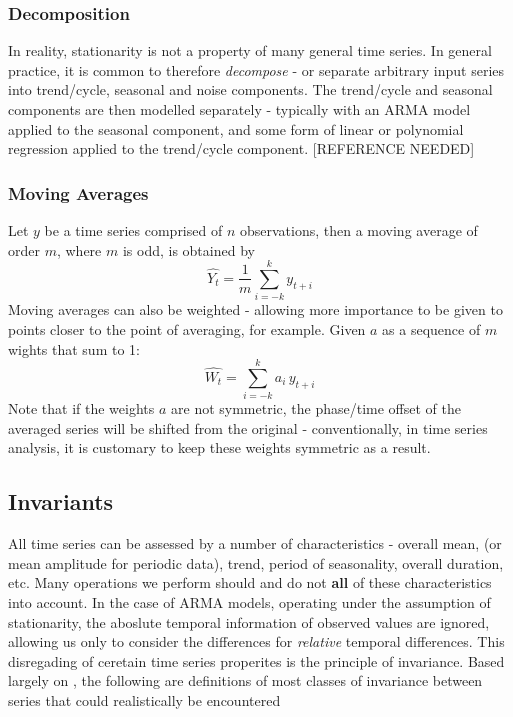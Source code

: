 \documentclass[9pt,conference]{IEEEtran}
\begin{document}
\subsubsection{Decomposition}
In reality, stationarity is not a property of many general time series. In general practice, it is common to therefore \textit{decompose} - or separate arbitrary input series into trend/cycle, seasonal and noise components. The trend/cycle and seasonal components are then modelled separately - typically with an ARMA model applied to the seasonal component, and some form of linear or polynomial regression applied to the trend/cycle component. [REFERENCE NEEDED]

\subsubsection{Moving Averages}
 Let $y$ be a time series comprised of $n$ observations, then a moving average of order $m$, where $m$ is odd, is obtained by
        \begin{equation}
            \hat{Y_t} = \frac{1}{m}\sum_{i = -k}^{k}y_{t+i}
        \end{equation}
        Moving averages can also be weighted - allowing more importance to be given to points closer to the point of averaging, for example. Given $a$ as a sequence of $m$ wights that sum to 1:
        \begin{equation}
            \hat{W_t} = \sum_{i = -k}^{k}a_i\,y_{t+i}
        \end{equation}
        Note that if the weights $a$ are not symmetric, the phase/time offset of the averaged series will be shifted from the original - conventionally, in time series analysis, it is customary to keep these weights symmetric as a result.

\subsection{Invariants}
 All time series can be assessed by a number of characteristics - overall mean, (or mean amplitude for periodic data), trend, period of seasonality, overall duration, etc. Many operations we perform should and do not \textbf{all} of these characteristics into account. In the case of ARMA models, operating under the assumption of stationarity, the aboslute temporal information of observed values are ignored, allowing us only to consider the differences for \textit{relative} temporal differences. This disregading of ceretain time series properites is the principle of invariance. Based largely on \cite{batista2014cid}, the following are definitions of most classes of invariance between series that could realistically be encountered
\end{document}
